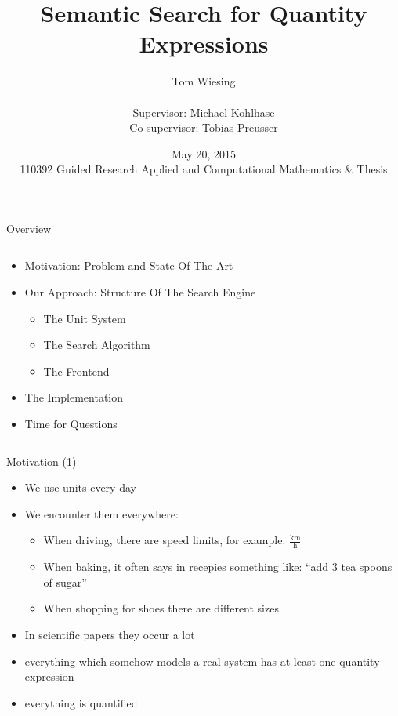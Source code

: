 \documentclass{beamer}
\title{Semantic Search for Quantity Expressions}
\author{Tom Wiesing\\\ \\Supervisor: Michael Kohlhase\\Co-supervisor: Tobias Preusser}
\date{May 20, 2015 \\110392 Guided Research Applied and Computational Mathematics \& Thesis}
\begin{document}
  \frame{\titlepage}

  \begin{frame}{Overview}
    \pause
    \begin{columns}[T]
      \begin{column}[T]{7cm}
        \begin{itemize}[<+->]
          \item Motivation: Problem and State Of The Art
          \item Our Approach: Structure Of The Search Engine
          \begin{itemize}
            \item The Unit System
            \item The Search Algorithm
            \item The Frontend
          \end{itemize}
          \item The Implementation
          \item Time for Questions
        \end{itemize}
      \end{column}
    \end{columns}
  \end{frame}

  \begin{frame}{Motivation (1)}
    \begin{itemize}[<+->]
      \item We use units every day
      \item We encounter them everywhere:
      \begin{itemize}[<+->]
        \item When driving, there are speed limits, for example:  $\frac{\text{km}}{\text{h}}$ %
        \item When baking, it often says in recepies something like: ``add 3 tea spoons of sugar''
        \item When shopping for shoes there are different sizes
      \end{itemize}
      \item In scientific papers they occur a lot
      \item everything which somehow models a real system has at least one quantity expression
      \item everything is quantified
    \end{itemize}
  \end{frame}
\end{document}
